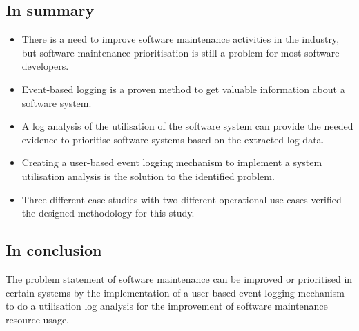 \subsection{In summary}
\begin{itemize}
	\item There is a need to improve software maintenance activities in the industry, but software
	maintenance prioritisation is still a problem for most software developers.
	\item Event-based logging is a proven method to get valuable information about a software
	system.
	\item A log analysis of the utilisation of the software system can provide the needed evidence
	to prioritise software systems based on the extracted log data.
	\item Creating a user-based event logging mechanism to implement a system utilisation analysis
	is the solution to the identified problem.
	\item Three different case studies with two different operational use cases verified the
	designed methodology for this study.
\end{itemize}

\subsection{In conclusion}
The problem statement of software maintenance can be improved or prioritised in certain systems by
the implementation of a user-based event logging mechanism to do a utilisation log analysis for the
improvement of software maintenance resource usage.